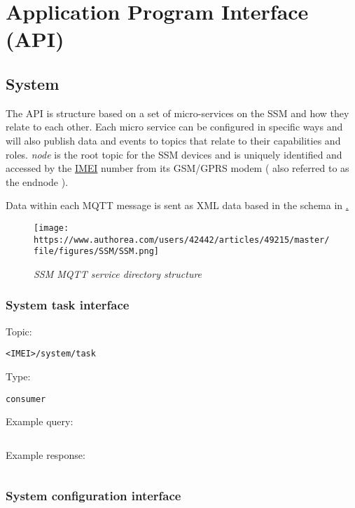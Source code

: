 \section{Application Program Interface (API)}
\subsection{System}
The API is structure based on a set of micro-services on the SSM and how they relate to each other. Each micro service can be configured in specific ways and will also publish data and events to topics that relate to their capabilities and roles. \textit{node} is the root topic for the SSM devices and is uniquely identified and accessed by the \href{http://www.gsma.com/technicalprojects/faq/what-is-an-imei}{IMEI} number from its GSM/GPRS modem ( also referred to as the endnode ).

Data within each MQTT message is sent as XML data based in the schema in \href{Appendix B}.

\begin{figure}[h]
    \centering
    \texttt{[image: https://www.authorea.com/users/42442/articles/49215/master/file/figures/SSM/SSM.png]}
    \caption{\textit{SSM MQTT service directory structure}}
\end{figure}
\subsubsection{System task interface}

Topic:
\begin{lstlisting}<IMEI>/system/task\end{lstlisting}
Type:
\begin{lstlisting}consumer\end{lstlisting}
Example query:
\begin{lstlisting}\end{lstlisting}
Example response:
\begin{lstlisting}\end{lstlisting}

\subsubsection{System configuration interface}


